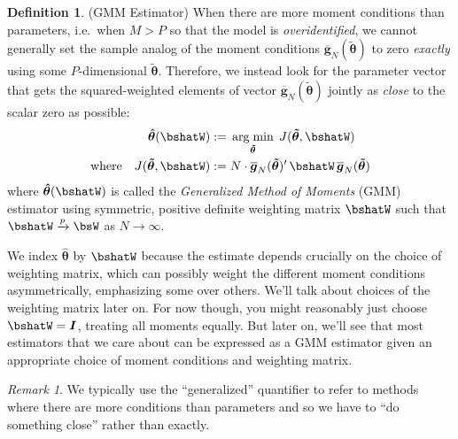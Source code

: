 \documentclass[12pt]{article}
\theoremstyle{plain}
\theoremstyle{definition}
\newtheorem{defn}[thm]{Definition}
\theoremstyle{remark}
\newtheorem*{rmk}{Remark}
\newcommand{\ra}{\rightarrow}
\newcommand{\bshattheta}{\boldsymbol{\hat{\theta}}}
\newcommand{\bstildetheta}{\boldsymbol{\tilde{\theta}}}
\newcommand{\bsbarg}{\boldsymbol{\overline{g}}}
\DeclareMathOperator*{\argmin}{arg\;min}
\newcommand{\pto}{\xrightarrow{p}}
\begin{document}
\begin{defn}(GMM Estimator)
\label{defn:gmm}
When there are more moment conditions than parameters, i.e.\ when $M>P$
so that the model is \emph{overidentified}, we cannot generally set the
sample analog of the moment conditions $\bsbarg_N(\bstildetheta)$ to zero
\emph{exactly} using some $P$-dimensional $\bstildetheta$.
Therefore, we instead look for the parameter vector that gets the
squared-weighted elements of vector $\bsbarg_N(\bstildetheta)$ jointly as
\emph{close} to the scalar zero as possible:
\begin{align}
  \bshattheta(\bshatW) :=&\;
  \argmin_{\bstildetheta} \; J(\bstildetheta,\bshatW)
  \label{eq:bhatmin} \\
  \text{where}\quad
  J(\bstildetheta,\bshatW)
  :=&\;
  N\cdot \bsbarg_N(\bstildetheta)' \, \bshatW \, \bsbarg_N(\bstildetheta)
  \notag
\end{align}
where $\bshattheta(\bshatW)$ is called
the \emph{Generalized Method of Moments} (GMM) estimator using
symmetric, positive definite weighting matrix $\bshatW$ such that
$\bshatW\pto \bsW$ as $N\ra\infty$.

We index $\bshattheta$ by $\bshatW$ because the estimate depends
crucially on the choice of weighting matrix, which can possibly weight
the different moment conditions asymmetrically, emphasizing some over
others.
We'll talk about choices of the weighting matrix
later on. For now though, you might reasonably just
choose $\bshatW=\boldsymbol{I}$, treating all moments
equally.
But later on, we'll see that most estimators that we care about can be
expressed as a GMM estimator given an appropriate choice of moment
conditions and weighting matrix.
\end{defn}


\begin{rmk}
We typically use the ``generalized'' quantifier to refer to methods
where there are more conditions than parameters and so we have to ``do
something close'' rather than exactly.
\end{rmk}
\end{document}
